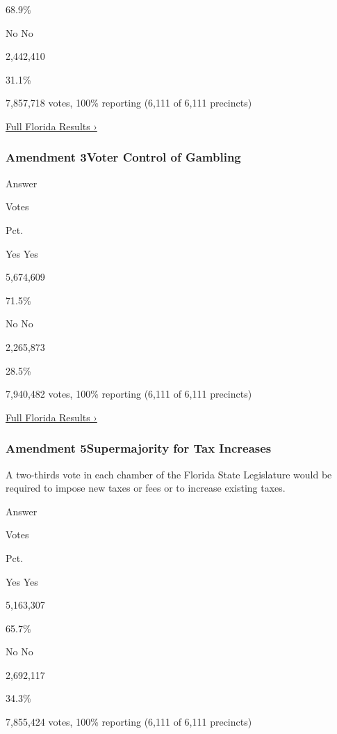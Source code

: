 68.9\%

 No No

2,442,410

31.1\%

7,857,718 votes, 100\% reporting (6,111 of 6,111 precincts)

\href{https://www.nytimes3xbfgragh.onion/interactive/2018/11/06/us/elections/results-florida-elections.html}{Full
Florida Results ›}

\hypertarget{amendment-3voter-control-of-gambling}{%
\subsubsection{Amendment 3Voter Control of
Gambling}\label{amendment-3voter-control-of-gambling}}

Answer

Votes

Pct.

 Yes Yes

5,674,609

71.5\%

 No No

2,265,873

28.5\%

7,940,482 votes, 100\% reporting (6,111 of 6,111 precincts)

\href{https://www.nytimes3xbfgragh.onion/interactive/2018/11/06/us/elections/results-florida-elections.html}{Full
Florida Results ›}

\hypertarget{amendment-5supermajority-for-tax-increases}{%
\subsubsection{Amendment 5Supermajority for Tax
Increases}\label{amendment-5supermajority-for-tax-increases}}

A two-thirds vote in each chamber of the Florida State Legislature would
be required to impose new taxes or fees or to increase existing taxes.

Answer

Votes

Pct.

 Yes Yes

5,163,307

65.7\%

 No No

2,692,117

34.3\%

7,855,424 votes, 100\% reporting (6,111 of 6,111 precincts)

